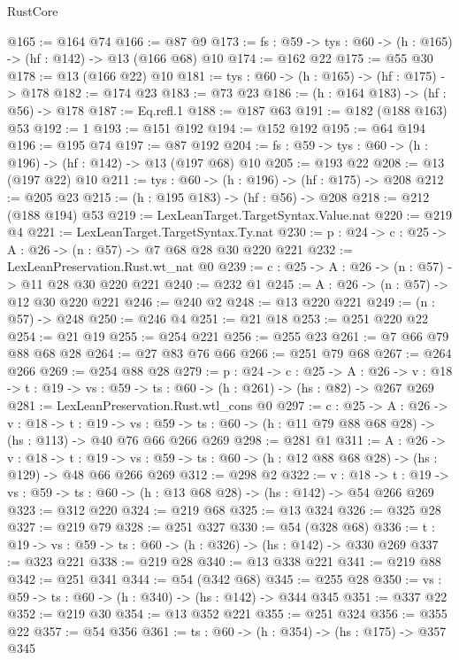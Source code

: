 \begin{lexlean}{RustCore}
\begin{coremodule}
@165 := @164 @74
@166 := @87 @9
@173 := {fs : @59} -> {tys : @60} -> (h : @165) -> (hf : @142) -> @13 (@166 @68) @10
@174 := @162 @22
@175 := @55 @30
@178 := @13 (@166 @22) @10
@181 := {tys : @60} -> (h : @165) -> (hf : @175) -> @178
@182 := @174 @23
@183 := @73 @23
@186 := (h : @164 @183) -> (hf : @56) -> @178
@187 := Eq.refl.{1}
@188 := @187 @63
@191 := @182 (@188 @163) @53
@192 := 1
@193 := @151 @192
@194 := @152 @192
@195 := @64 @194
@196 := @195 @74
@197 := @87 @192
@204 := {fs : @59} -> {tys : @60} -> (h : @196) -> (hf : @142) -> @13 (@197 @68) @10
@205 := @193 @22
@208 := @13 (@197 @22) @10
@211 := {tys : @60} -> (h : @196) -> (hf : @175) -> @208
@212 := @205 @23
@215 := (h : @195 @183) -> (hf : @56) -> @208
@218 := @212 (@188 @194) @53
@219 := LexLeanTarget.TargetSyntax.Value.nat
@220 := @219 @4
@221 := LexLeanTarget.TargetSyntax.Ty.nat
@230 := {p : @24} -> {c : @25} -> {A : @26} -> (n : @57) -> @7 @68 @28 @30 @220 @221
@232 := LexLeanPreservation.Rust.wt_nat @0
@239 := {c : @25} -> {A : @26} -> (n : @57) -> @11 @28 @30 @220 @221
@240 := @232 @1
@245 := {A : @26} -> (n : @57) -> @12 @30 @220 @221
@246 := @240 @2
@248 := @13 @220 @221
@249 := (n : @57) -> @248
@250 := @246 @4
@251 := @21 @18
@253 := @251 @220 @22
@254 := @21 @19
@255 := @254 @221
@256 := @255 @23
@261 := @7 @66 @79 @88 @68 @28
@264 := @27 @83 @76 @66
@266 := @251 @79 @68
@267 := @264 @266
@269 := @254 @88 @28
@279 := {p : @24} ->
  {c : @25} ->
  {A : @26} ->
  {v : @18} -> {t : @19} -> {vs : @59} -> {ts : @60} -> (h : @261) -> (hs : @82) -> @267 @269
@281 := LexLeanPreservation.Rust.wtl_cons @0
@297 := {c : @25} ->
  {A : @26} ->
  {v : @18} ->
  {t : @19} ->
  {vs : @59} -> {ts : @60} -> (h : @11 @79 @88 @68 @28) -> (hs : @113) -> @40 @76 @66 @266 @269
@298 := @281 @1
@311 := {A : @26} ->
  {v : @18} ->
  {t : @19} -> {vs : @59} -> {ts : @60} -> (h : @12 @88 @68 @28) -> (hs : @129) -> @48 @66 @266 @269
@312 := @298 @2
@322 := {v : @18} ->
  {t : @19} -> {vs : @59} -> {ts : @60} -> (h : @13 @68 @28) -> (hs : @142) -> @54 @266 @269
@323 := @312 @220
@324 := @219 @68
@325 := @13 @324
@326 := @325 @28
@327 := @219 @79
@328 := @251 @327
@330 := @54 (@328 @68)
@336 := {t : @19} -> {vs : @59} -> {ts : @60} -> (h : @326) -> (hs : @142) -> @330 @269
@337 := @323 @221
@338 := @219 @28
@340 := @13 @338 @221
@341 := @219 @88
@342 := @251 @341
@344 := @54 (@342 @68)
@345 := @255 @28
@350 := {vs : @59} -> {ts : @60} -> (h : @340) -> (hs : @142) -> @344 @345
@351 := @337 @22
@352 := @219 @30
@354 := @13 @352 @221
@355 := @251 @324
@356 := @355 @22
@357 := @54 @356
@361 := {ts : @60} -> (h : @354) -> (hs : @175) -> @357 @345

\end{coremodule}
\end{lexlean}
